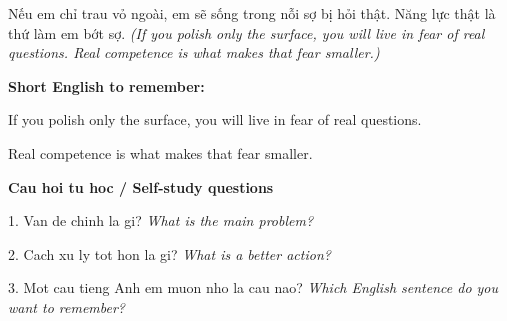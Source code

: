 \begin{baihoc}
Nếu em chỉ trau vỏ ngoài, em sẽ sống trong nỗi sợ bị hỏi thật. Năng lực thật là thứ làm em bớt sợ.
\textit{(If you polish only the surface, you will live in fear of real questions. Real competence is what makes that fear smaller.)}
\end{baihoc}

\begin{ghinhoanh}
\textbf{Short English to remember:}

If you polish only the surface, you will live in fear of real questions.

Real competence is what makes that fear smaller.

\end{ghinhoanh}

\begin{tuhocnhanh}
\textbf{Cau hoi tu hoc / Self-study questions}

1. Van de chinh la gi? \textit{What is the main problem?}

2. Cach xu ly tot hon la gi? \textit{What is a better action?}

3. Mot cau tieng Anh em muon nho la cau nao? \textit{Which English sentence do you want to remember?}
\end{tuhocnhanh}
